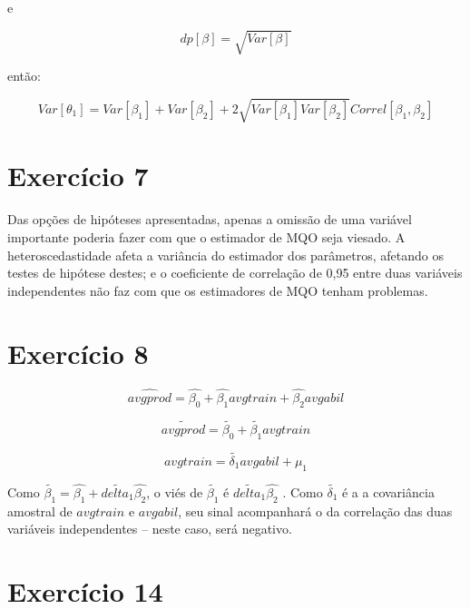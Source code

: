 \documentclass[hidelinks,11pt]{book}
\theoremstyle{definition}
\begin{document}
e

\begin{displaymath}
	dp[\beta] = \sqrt{Var[\beta]}
\end{displaymath}

então:

\begin{displaymath}
	Var[\theta_1] = Var[\beta_1] + Var[\beta_2] + 2\sqrt{Var[\beta_1]Var[\beta_2]}Correl[\beta_1, \beta_2]
\end{displaymath}



\section*{Exercício 7}

Das opções de hipóteses apresentadas, apenas a omissão de uma variável importante poderia fazer com que o estimador de MQO seja viesado. A heteroscedastidade afeta a variância do estimador dos parâmetros, afetando os testes de hipótese destes; e o coeficiente de correlação de 0,95 entre duas variáveis independentes não faz com que os estimadores de MQO tenham problemas.

\section*{Exercício 8}

\begin{displaymath}
	\hat{avgprod} = \hat{\beta_0} + \hat{\beta_1}avgtrain + \hat{\beta_2}avgabil
\end{displaymath}

\begin{displaymath}
	\tilde{avgprod} = \tilde{\beta_0} + \tilde{\beta_1}avgtrain
\end{displaymath}

\begin{displaymath}
	avgtrain = \tilde{\delta_1} avgabil + \mu_1
\end{displaymath}

Como $\tilde{\beta_1} = \hat{\beta_1} + \tilde{delta_1} \hat{\beta_2}$, o viés de $\tilde{\beta_1}$ é $\tilde{delta_1} \hat{\beta_2}$ . Como $\tilde{\delta_1}$ é a a covariância amostral de $avgtrain$ e $avgabil$, seu sinal acompanhará o da correlação das duas variáveis independentes – neste caso, será negativo. 

\section*{Exercício 14}
\end{document}
